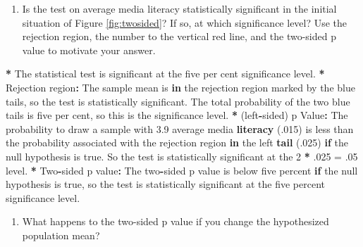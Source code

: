 \documentclass[a4paper]{book}
\newenvironment{Shaded}{\begin{snugshade}}{\end{snugshade}}
\newcommand{\KeywordTok}[1]{\textcolor[rgb]{0,0,0}{\textbf{#1}}}
\newcommand{\DecValTok}[1]{\textcolor[rgb]{0.00,0.00,0.00}{#1}}
\newcommand{\FloatTok}[1]{\textcolor[rgb]{0.00,0.00,0.00}{#1}}
\newcommand{\StringTok}[1]{\textcolor[rgb]{0.00,0.00,0.00}{#1}}
\newcommand{\ControlFlowTok}[1]{\textcolor[rgb]{0.00,0.00,0.00}{\textbf{#1}}}
\newcommand{\OperatorTok}[1]{\textcolor[rgb]{0.00,0.00,0.00}{\textbf{#1}}}
\newcommand{\NormalTok}[1]{#1}
\providecommand{\tightlist}{%
  \setlength{\itemsep}{0pt}\setlength{\parskip}{0pt}}
\theoremstyle{definition}
\theoremstyle{definition}
\theoremstyle{definition}
\theoremstyle{remark}
\begin{document}
\begin{enumerate}
\def\labelenumi{\arabic{enumi}.}
\setcounter{enumi}{2}
\tightlist
\item
  Is the test on average media literacy statistically significant in the
  initial situation of Figure \ref{fig:twosided}? If so, at which
  significance level? Use the rejection region, the number to the
  vertical red line, and the two-sided p value to motivate your answer.
\end{enumerate}

\begin{Shaded}
\begin{Highlighting}[]
\OperatorTok{*}\StringTok{ }\NormalTok{The statistical test is significant at the five per cent significance level.}
\OperatorTok{*}\StringTok{ }\NormalTok{Rejection region}\OperatorTok{:}\StringTok{ }\NormalTok{The sample mean is }\ControlFlowTok{in}\NormalTok{ the rejection region marked by the}
\NormalTok{blue tails, so the test is statistically significant. The total probability of}
\NormalTok{the two blue tails is five per cent, so this is the significance level.}
\OperatorTok{*}\StringTok{ }\NormalTok{(left}\OperatorTok{-}\NormalTok{sided) p Value}\OperatorTok{:}\StringTok{ }\NormalTok{The probability to draw a sample with }\FloatTok{3.9}\NormalTok{ average media}
\KeywordTok{literacy}\NormalTok{ (.}\DecValTok{015}\NormalTok{) is less than the probability associated with the rejection}
\NormalTok{region }\ControlFlowTok{in}\NormalTok{ the left }\KeywordTok{tail}\NormalTok{ (.}\DecValTok{025}\NormalTok{) }\ControlFlowTok{if}\NormalTok{ the null hypothesis is true. So the test is}
\NormalTok{statistically significant at the }\DecValTok{2} \OperatorTok{*}\StringTok{ }\NormalTok{.}\DecValTok{025}\NormalTok{ =}\StringTok{ }\NormalTok{.}\DecValTok{05}\NormalTok{ level.}
\OperatorTok{*}\StringTok{ }\NormalTok{Two}\OperatorTok{-}\NormalTok{sided p value}\OperatorTok{:}\StringTok{ }\NormalTok{The two}\OperatorTok{-}\NormalTok{sided p value is below five percent }\ControlFlowTok{if}\NormalTok{ the null}
\NormalTok{hypothesis is true, so the test is statistically significant at the five}
\NormalTok{percent significance level.}
\end{Highlighting}
\end{Shaded}

\begin{enumerate}
\def\labelenumi{\arabic{enumi}.}
\setcounter{enumi}{3}
\tightlist
\item
  What happens to the two-sided p value if you change the hypothesized
  population mean?
\end{enumerate}
\end{document}
